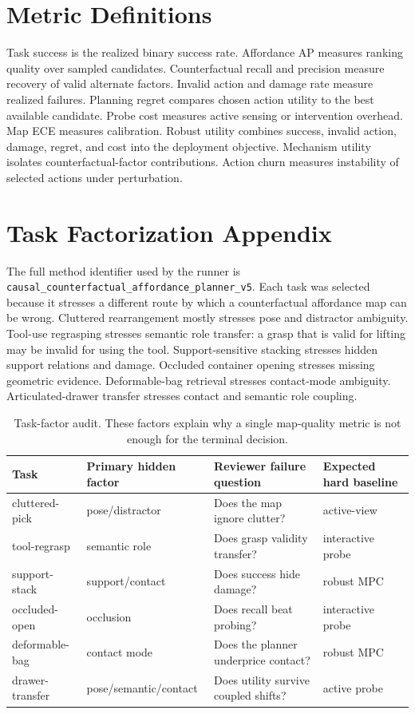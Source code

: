 \documentclass{article}
\begin{document}
\section{Metric Definitions}
Task success is the realized binary success rate. Affordance AP measures ranking quality over sampled candidates. Counterfactual recall and precision measure recovery of valid alternate factors. Invalid action and damage rate measure realized failures. Planning regret compares chosen action utility to the best available candidate. Probe cost measures active sensing or intervention overhead. Map ECE measures calibration. Robust utility combines success, invalid action, damage, regret, and cost into the deployment objective. Mechanism utility isolates counterfactual-factor contributions. Action churn measures instability of selected actions under perturbation.

\section{Task Factorization Appendix}
The full method identifier used by the runner is \texttt{causal\_\allowbreak counterfactual\_\allowbreak affordance\_\allowbreak planner\_\allowbreak v5}. Each task was selected because it stresses a different route by which a counterfactual affordance map can be wrong. Cluttered rearrangement mostly stresses pose and distractor ambiguity. Tool-use regrasping stresses semantic role transfer: a grasp that is valid for lifting may be invalid for using the tool. Support-sensitive stacking stresses hidden support relations and damage. Occluded container opening stresses missing geometric evidence. Deformable-bag retrieval stresses contact-mode ambiguity. Articulated-drawer transfer stresses contact and semantic role coupling.

\begin{table}[t]
\centering
\small
\begin{tabular}{llll}
\toprule
Task & Primary hidden factor & Reviewer failure question & Expected hard baseline \\
\midrule
cluttered-pick & pose/distractor & Does the map ignore clutter? & active-view \\
tool-regrasp & semantic role & Does grasp validity transfer? & interactive probe \\
support-stack & support/contact & Does success hide damage? & robust MPC \\
occluded-open & occlusion & Does recall beat probing? & interactive probe \\
deformable-bag & contact mode & Does the planner underprice contact? & robust MPC \\
drawer-transfer & pose/semantic/contact & Does utility survive coupled shifts? & active probe \\
\bottomrule
\end{tabular}
\caption{Task-factor audit. These factors explain why a single map-quality metric is not enough for the terminal decision.}
\label{tab:taskfactor}
\end{table}
\end{document}
